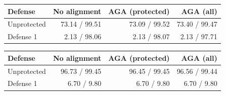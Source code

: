 \begin{tabular}{lrrr}
\toprule
Defense & No alignment & AGA (protected) & AGA (all) \\
\midrule
Unprotected & 73.14 / 99.51 & 73.09 / 99.52 & 73.40 / 99.47 \\
Defense 1 & 2.13 / 98.06 & 2.13 / 98.07 & 2.13 / 97.71 \\
\bottomrule
\end{tabular}

\begin{tabular}{lrrr}
\toprule
Defense & No alignment & AGA (protected) & AGA (all) \\
\midrule
Unprotected & 96.73 / 99.45 & 96.45 / 99.45 & 96.56 / 99.44 \\
Defense 1 & 6.70 / 9.80 & 6.70 / 9.80 & 6.70 / 9.80 \\
\bottomrule
\end{tabular}

